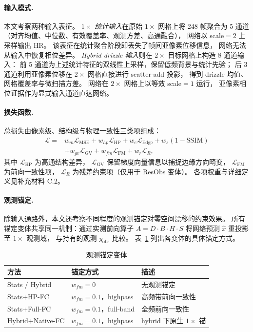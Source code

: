 \paragraph{输入模式.}
本文考察两种输入表征。
\emph{\(1\times\) 统计输入}在原始 \(1\times\) 网格上将 248 帧聚合为 5 通道
（对齐均值、中位数、有效覆盖率、观测方差、高通融合），
网络以 scale\(=2\) 上采样输出 HR。
该表征在统计聚合阶段即丢失了帧间亚像素位移信息，
网络无法从输入中恢复相位差异。
\emph{Hybrid drizzle 输入}则在 \(2\times\) 目标网格上构造 8 通道输入：
前 5 通道为上述统计特征的双线性上采样，保留低频背景与统计先验；
后 3 通道利用亚像素位移在 \(2\times\) 网格直接进行 scatter-add 投影，
得到 drizzle 均值、网格覆盖率与微扫描方差。
网络在 \(2\times\) 网格上以等效 scale\(=1\) 运行，
亚像素相位证据作为显式输入通道直达网络。

\paragraph{损失函数.}
总损失由像素级、结构级与物理一致性三类项组成：
\begin{equation}
\begin{split}
  \mathcal{L} ={} &
  w_m \mathcal{L}_{\mathrm{MSE}} +
  w_{hp} \mathcal{L}_{\mathrm{HP}} +
  w_e \mathcal{L}_{\mathrm{Edge}} +
  w_s (1 \!-\! \mathrm{SSIM}) \\
  & + w_{gv} \mathcal{L}_{\mathrm{GV}} +
  w_{fm} \mathcal{L}_{\mathrm{FM}} +
  w_r \mathcal{L}_R,
\end{split}
\end{equation}
其中 \(\mathcal{L}_{\mathrm{HP}}\) 为高通结构差异，
\(\mathcal{L}_{\mathrm{GV}}\) 保留梯度向量信息以捕捉边缘方向畸变，
\(\mathcal{L}_{\mathrm{FM}}\) 为前向一致性项，
\(\mathcal{L}_R\) 为残差约束项（仅用于 ResObs 变体）。
各项权重与详细定义见补充材料 C.2。

\paragraph{观测锚定.}
除输入通路外，本文还考察不同程度的观测锚定对零空间漂移的约束效果。
所有锚定变体共享同一机制：通过实测前向算子 \(A = D \cdot B \cdot H \cdot S\)
将网络预测 \(\hat{x}\) 重投影至 \(1\times\) 观测域，
与持有的观测 \(y_{\mathrm{obs}}\) 比较。
表~\ref{tab:anchor-variants} 列出各变体的具体锚定方式。

\begin{table}[t]
  \centering
  \caption{观测锚定变体}
  \label{tab:anchor-variants}
  \scriptsize
  \begin{tabular}{lll}
    \toprule
    方法 & 锚定方式 & 描述 \\
    \midrule
    Stats / Hybrid & \(w_{fm}=0\) & 无观测锚定 \\
    Stats+HP-FC & \(w_{fm}=0.1\)，highpass & 高频带前向一致性 \\
    Stats+Full-FC & \(w_{fm}=0.1\)，full-band & 全频前向一致性 \\
    Hybrid+Native-FC & \(w_{fm}=0.1\)，highpass & hybrid 下原生 \(1\times\) 锚 \\
    \bottomrule
  \end{tabular}
\end{table}

